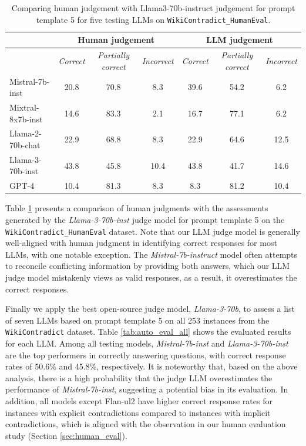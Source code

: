 \begin{table}[t]
    \centering
    \caption{Comparing human judgement with Llama3-70b-instruct judgement for prompt template 5 for five testing LLMs on \texttt{WikiContradict\_HumanEval}. }
    \label{tab:auto_eval_comp}
    \begin{small}
    \begin{tabular}{|l|c|c|c|c|c|c|}
    \hline
        & \multicolumn{3}{c|}{\textbf{Human judgement}}& \multicolumn{3}{c|}{\textbf{LLM judgement}} \\ \hline
        ~ & \emph{Correct} & \emph{Partially correct} & \emph{Incorrect} & \emph{Correct} & \emph{Partially correct} & \emph{Incorrect} \\ \hline
        Mistral-7b-inst & 20.8 & 70.8 & 8.3 & 39.6 & 54.2 & 6.2 \\ \hline
        Mixtral-8x7b-inst & 14.6 & 83.3 & 2.1 & 16.7 & 77.1 & 6.2 \\ \hline
        Llama-2-70b-chat & 22.9 & 68.8 & 8.3 & 22.9 & 64.6 & 12.5 \\ \hline
        Llama-3-70b-inst & 43.8 & 45.8 & 10.4 & 43.8 & 41.7 & 14.6 \\ \hline
        GPT-4 & 10.4 & 81.3 & 8.3 & 8.3 & 81.2 & 10.4 \\ \hline
    \end{tabular}
    \end{small}
\end{table}



Table \ref{tab:auto_eval_comp} presents a comparison of human judgments with the assessments generated by the \emph{Llama-3-70b-inst} judge model for prompt template 5 on the \texttt{WikiContradict\_HumanEval} dataset. Note that our LLM judge model is generally well-aligned with human judgment in identifying correct responses for most LLMs, with one notable exception. The \emph{Mistral-7b-instruct} model often attempts to reconcile conflicting information by providing both answers, which our LLM judge model mistakenly views as valid responses, as a result, it overestimates the correct responses.%

Finally we apply the best open-source judge model, \emph{Llama-3-70b}, to assess a list of seven LLMs based on prompt template 5 on all 253 instances from the \texttt{WikiContradict} dataset. Table \ref{tab:auto_eval_all} shows the evaluated results for each LLM. Among all testing models, \emph{Mistral-7b-inst} and \emph{Llama-3-70b-inst} are the top performers in correctly answering questions, with correct response rates of 50.6\% and 45.8\%, respectively. It is noteworthy that, based on the above analysis, there is a high probability that the judge LLM overestimates the performance of \emph{Mistral-7b-inst}, suggesting a potential bias in its evaluation. In addition, all models except Flan-ul2 have higher correct response rates for instances with explicit contradictions compared to instances with implicit contradictions, which is aligned with the observation in our human evaluation study (Section \ref{sec:human_eval}).

